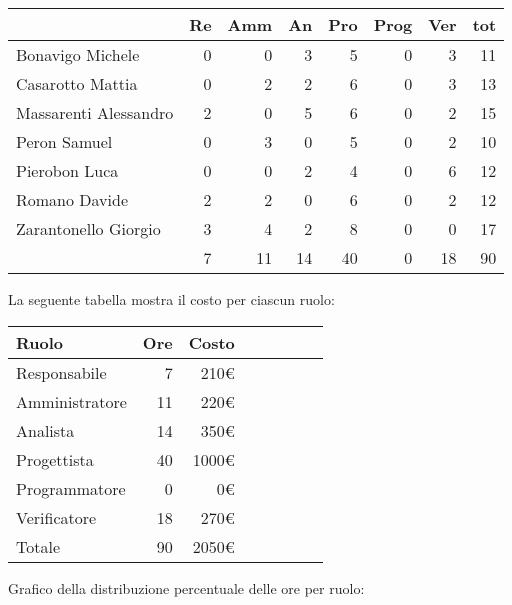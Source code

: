 \begin{table}[ht]
    \begin{tabularx}{\linewidth}{X|rrrrrrr}
    \rowcolor{gray!30}& Re & Amm & An & Pro & Prog & Ver & tot \\
    \hline
    Bonavigo Michele                        & 0 & 0 & 3 & 5 & 0 & 3 & 11 \\
    \rowcolor{gray!10}Casarotto Mattia      & 0 & 2 & 2 & 6 & 0 & 3 & 13 \\
    Massarenti Alessandro                   & 2 & 0 & 5 & 6 & 0 & 2 & 15 \\
    \rowcolor{gray!10}Peron Samuel          & 0 & 3 & 0 & 5 & 0 & 2 & 10 \\
    Pierobon Luca                           & 0 & 0 & 2 & 4 & 0 & 6 & 12 \\
    \rowcolor{gray!10}Romano Davide         & 2 & 2 & 0 & 6 & 0 & 2 & 12 \\
    Zarantonello Giorgio                    & 3 & 4 & 2 & 8 & 0 & 0 & 17 \\
    \hline                                  & 7 & 11 & 14 & 40 & 0 & 18 & 90 \\ 
    \end{tabularx}
\end{table}

La seguente tabella mostra il costo per ciascun ruolo:
\begin{table}[ht]
    \begin{tabularx}{\linewidth}{X|rrrrrrr}
    \rowcolor{gray!30}Ruolo & Ore & Costo \\
    \hline
    Responsabile                            & 7 & 210€ \\
    \rowcolor{gray!10}Amministratore        & 11 & 220€ \\
    Analista                                & 14 & 350€ \\
    \rowcolor{gray!10}Progettista           & 40 & 1000€ \\
    Programmatore                           & 0 & 0€ \\
    \rowcolor{gray!10}Verificatore          & 18 & 270€ \\
    \hline Totale                           & 90 & 2050€ \\ 
    \end{tabularx}
\end{table}

Grafico della distribuzione percentuale delle ore per ruolo:
\begin{center}
\end{center}

